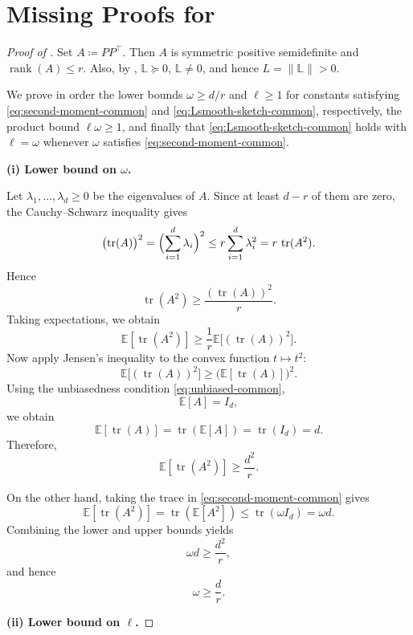 \documentclass[10pt]{article}
\newcommand{\tr}{\operatorname{tr}}
\newcommand{\E}{\mathbb{E}}
\newcommand{\Lmat}{\mathbb{L}}
\begin{document}
\section{Missing Proofs for  }
\label{app:missing-proofs-prem}

\begin{proof}[Proof of ]

Set \(A\coloneqq PP^\top\). Then \(A\) is symmetric positive semidefinite and
\(\operatorname{rank}(A)\le r\). Also, by
, \(\Lmat\succeq0\), \(\Lmat\neq0\), and hence
\(L=\|\Lmat\|>0\).


We prove in order the lower bounds \(\omega\ge d/r\) and \(\ell\ge1\) for
constants satisfying \eqref{eq:second-moment-common} and
\eqref{eq:Lsmooth-sketch-common}, respectively, the product bound
\(\ell\omega\ge1\), and finally that \eqref{eq:Lsmooth-sketch-common} holds
with \(\ell=\omega\) whenever \(\omega\) satisfies
\eqref{eq:second-moment-common}.

\par\smallskip
\noindent\textbf{(i) Lower bound on \(\omega\).}

Let \(\lambda_1,\dots,\lambda_d\ge 0\) be the eigenvalues of \(A\).
Since at least \(d-r\) of them are zero, the Cauchy--Schwarz inequality gives
\[
\bigl(\tr(A)\bigr)^2
=
\Bigl(\sum_{i=1}^d \lambda_i\Bigr)^2
\le
r\sum_{i=1}^d \lambda_i^2
=
r\,\tr(A^2).
\]
Hence
\[
\tr(A^2)\ge \frac{(\tr(A))^2}{r}.
\]
Taking expectations, we obtain
\[
\E[\tr(A^2)]
\ge
\frac{1}{r}\E\bigl[(\tr(A))^2\bigr].
\]
Now apply Jensen's inequality to the convex function \(t\mapsto t^2\):
\[
\E\bigl[(\tr(A))^2\bigr]
\ge
\bigl(\E[\tr(A)]\bigr)^2.
\]
Using the unbiasedness condition \eqref{eq:unbiased-common},
\[
\E[A]=I_d,
\]
we obtain
\[
\E[\tr(A)]
=
\tr(\E[A])
=
\tr(I_d)
=
d.
\]
Therefore,
\[
\E[\tr(A^2)]\ge \frac{d^2}{r}.
\]

On the other hand, taking the trace in \eqref{eq:second-moment-common} gives
\[
\E[\tr(A^2)]
=
\tr(\E[A^2])
\le
\tr(\omega I_d)
=
\omega d.
\]
Combining the lower and upper bounds yields
\[
\omega d \ge \frac{d^2}{r},
\]
and hence
\[
\omega\ge \frac{d}{r}.
\]



\par\smallskip
\noindent\textbf{(ii) Lower bound on \(\ell\).}


\end{proof}
\end{document}
